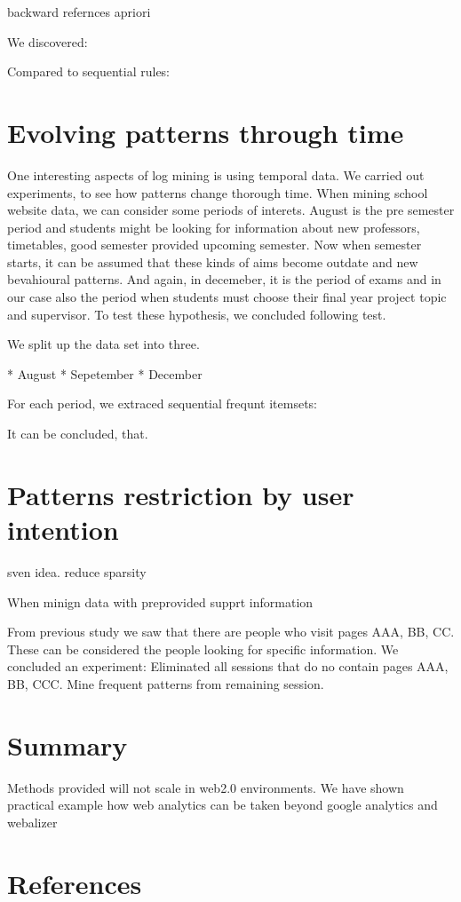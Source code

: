 \documentclass[english,a4paper]{article}
\begin{document}
backward refernces
apriori

We discovered:

Compared to sequential rules:








\section{Evolving patterns through time} 
One interesting aspects of log mining is using temporal data. We carried out experiments, to see how patterns change thorough time. When mining school website data, we can consider some periods of interets. August is the pre semester period and students might be looking for information about new professors, timetables, good semester provided upcoming semester. Now when semester starts, it can be assumed that these kinds of aims become outdate and new bevahioural patterns. And again, in decemeber, it is the period of exams and in our case also the period when students must choose their final year project topic and supervisor. To test these hypothesis, we concluded following test. 

We split up the data set into three.

* August
* Sepetember
* December

For each period, we extraced sequential frequnt itemsets:




It can be concluded, that.








\section{Patterns restriction by user intention}

sven idea. reduce sparsity 

When minign data with preprovided supprt information

From previous study we saw that there are people who visit pages AAA, BB, CC. These can be considered the people looking for specific information. We concluded an experiment:
Eliminated all sessions that do no contain pages AAA, BB, CCC.
Mine frequent patterns from remaining session.
















\section{Summary}
Methods provided will not scale in web2.0 environments.
We have shown practical example how web analytics can be taken beyond google analytics and webalizer










\section*{References}


\end{document}
